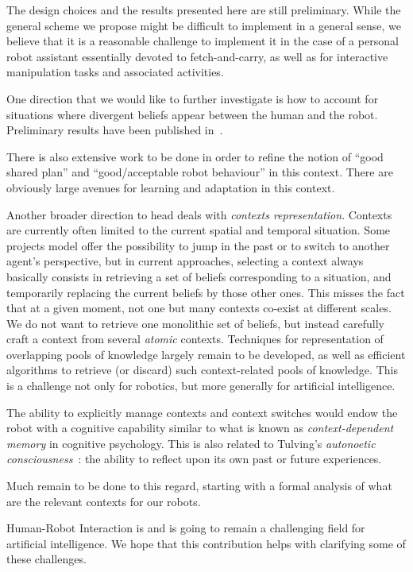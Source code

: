 \documentclass[preprint,3p,times]{elsarticle}
\begin{document}
The design choices and the results presented here are still preliminary.
While the general scheme we propose might be difficult to implement in
a general sense, we believe that it is a reasonable challenge to
implement it in the case of a personal robot assistant essentially
devoted to fetch-and-carry, as well as for interactive manipulation
tasks and associated activities.

One direction that we would like to further investigate is how to account for
situations where divergent beliefs appear between the human and the robot.
Preliminary results have been published in~\cite{warnier2012when}.

There is also extensive work to be done in order to refine the notion of ``good
shared plan'' and ``good/acceptable robot behaviour'' in this context. There are
obviously large avenues for learning and adaptation in this context.

Another broader direction to head deals with \emph{contexts representation}.
Contexts are currently often limited to the current spatial and temporal
situation. Some projects model offer the possibility to jump in the past or to
switch to another agent's perspective, but in current approaches, selecting a
context always basically consists in retrieving a set of beliefs corresponding
to a situation, and temporarily replacing the current beliefs by those other
ones. This misses the fact that at a given moment, not one but many contexts
co-exist at different scales. We do not want to retrieve one monolithic set of
beliefs, but instead carefully craft a context from several \emph{atomic}
contexts. Techniques for representation of overlapping pools of knowledge
largely remain to be developed, as well as efficient algorithms to retrieve (or
discard) such context-related pools of knowledge. This is a challenge not only
for robotics, but more generally for artificial intelligence.

The ability to explicitly manage contexts and context switches would endow the
robot with a cognitive capability similar to what is known as
\emph{context-dependent memory} in cognitive psychology. This is also related
to Tulving's \emph{autonoetic consciousness}~\cite{Tulving1985a}: the ability
to reflect upon its own past or future experiences.

Much remain to be done to this regard, starting with a formal analysis of what
are the relevant contexts for our robots.

Human-Robot Interaction is and is going to remain a challenging field for
artificial intelligence. We hope that this contribution helps with clarifying
some of these challenges.
\end{document}
